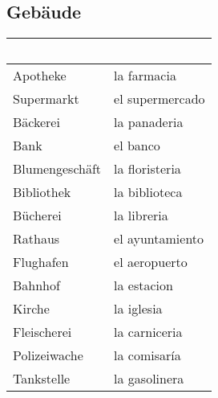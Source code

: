 \documentclass{spanish_summary}
\begin{document}
  \subsection*{Gebäude}
  \begin{longtable}{p{} | p{}} 
    \textbf{~}     & \textbf{~}                                       \\ \hline
    Apotheke & la farmacia\\
    Supermarkt & el supermercado\\
    Bäckerei & la panaderia\\
    Bank & el banco\\
    Blumengeschäft & la floristeria\\    
    Bibliothek & la biblioteca\\
    Bücherei & la libreria\\
    Rathaus & el ayuntamiento\\
    Flughafen & el aeropuerto\\
    Bahnhof & la estacion\\
    Kirche & la iglesia\\
    Fleischerei & la carniceria\\
    Polizeiwache & la comisaría\\
    Tankstelle & la gasolinera\\
  \end{longtable}
  
\end{document}
